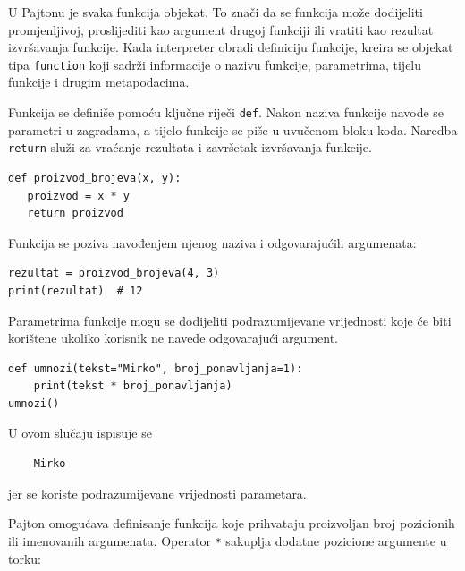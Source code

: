 U Pajtonu je svaka funkcija objekat. To znači da se funkcija može dodijeliti promjenljivoj, proslijediti kao argument drugoj funkciji ili vratiti kao rezultat izvršavanja funkcije. Kada interpreter obradi definiciju funkcije, kreira se objekat tipa \texttt{function} koji sadrži informacije o nazivu funkcije, parametrima, tijelu funkcije i drugim metapodacima.

Funkcija se definiše pomoću ključne riječi \texttt{def}. Nakon naziva funkcije navode se parametri u zagradama, a tijelo funkcije se piše u uvučenom bloku koda. Naredba \texttt{return} služi za vraćanje rezultata i završetak izvršavanja funkcije.

\begin{verbatim}
def proizvod_brojeva(x, y):
   proizvod = x * y
   return proizvod
\end{verbatim}

Funkcija se poziva navođenjem njenog naziva i odgovarajućih argumenata:

\begin{verbatim}
rezultat = proizvod_brojeva(4, 3)
print(rezultat)  # 12
\end{verbatim}


Parametrima funkcije mogu se dodijeliti podrazumijevane vrijednosti koje će biti korištene ukoliko korisnik ne navede odgovarajući argument.

\begin{verbatim}
def umnozi(tekst="Mirko", broj_ponavljanja=1):
    print(tekst * broj_ponavljanja)
umnozi()
\end{verbatim}

U ovom slučaju ispisuje se

\begin{verbatim}
	Mirko
\end{verbatim}

jer se koriste podrazumijevane vrijednosti parametara.


Pajton omogućava definisanje funkcija koje prihvataju proizvoljan broj pozicionih ili imenovanih argumenata.  Operator \texttt{*} sakuplja dodatne pozicione argumente u torku:

